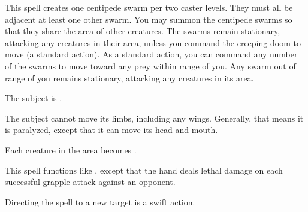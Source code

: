 \spelldur{\durmed}
\begin{spelleffect}
    This spell creates one centipede swarm per two caster levels. They must all be adjacent at least one other swarm. You may summon the centipede swarms so that they share the area of other creatures. The swarms remain stationary, attacking any creatures in their area, unless you command the creeping doom to move (a standard action). As a standard action, you can command any number of the swarms to move toward any prey within range of you. Any swarm out of range of you remains stationary, attacking any creatures in its area.
\end{spelleffect}

\spelldur{\durshort}
\begin{spellhealthy}
    The subject is \staggered.
\end{spellhealthy}
\begin{spellblood}
    The subject cannot move its limbs, including any wings. Generally, that means it is paralyzed, except that it can move its head and mouth.
\end{spellblood}

\spelldur{\durmed}
\begin{spelleffect}
    Each creature in the area becomes \vulnerable.
\end{spelleffect}

\begin{spelleffect}
    This spell functions like , except that the hand deals lethal damage on each successful grapple attack against an opponent.
\end{spelleffect}
\begin{spellnotes}
    Directing the spell to a new target is a swift action.
\end{spellnotes}

